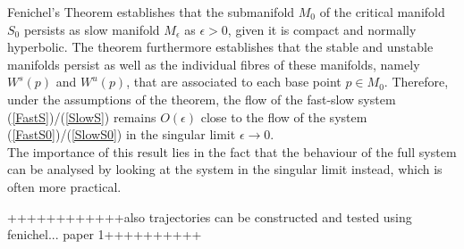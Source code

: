 Fenichel's Theorem establishes that the submanifold $M_0$ of the critical manifold $S_0$ persists as slow manifold $M_\epsilon$ as $\epsilon >0$, given it is compact and normally hyperbolic. The theorem furthermore establishes that the stable and unstable manifolds persist as well as the individual fibres of these manifolds, namely $W^s(p)$ and $W^u(p)$, that are associated to each base point $p \in M_0$.
Therefore, under the assumptions of the theorem, the flow of the fast-slow system (\ref{FastS})/(\ref{SlowS}) remains $O(\epsilon)$ close to the flow of the system (\ref{FastS0})/(\ref{SlowS0}) in the singular limit $\epsilon \to 0$.
\\
The importance of this result lies in the fact that the behaviour of the full system can be analysed by looking at the system in the singular limit instead, which is often more practical.


++++++++++++also trajectories can be constructed and tested using fenichel... paper 1++++++++++


